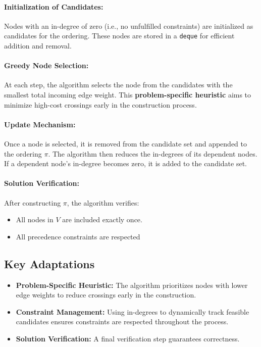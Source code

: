 \documentclass{article}
\begin{document}
\paragraph{Initialization of Candidates:}
Nodes with an in-degree of zero (i.e., no unfulfilled constraints) are initialized as candidates for the ordering. These nodes are stored in a \texttt{deque} for efficient addition and removal.

\paragraph{Greedy Node Selection:}
At each step, the algorithm selects the node from the candidates with the smallest total incoming edge weight. This \textbf{problem-specific heuristic} aims to minimize high-cost crossings early in the construction process.

\paragraph{Update Mechanism:}
Once a node is selected, it is removed from the candidate set and appended to the ordering \( \pi \). The algorithm then reduces the in-degrees of its dependent nodes. If a dependent node's in-degree becomes zero, it is added to the candidate set.

\paragraph{Solution Verification:}
After constructing \( \pi \), the algorithm verifies:
\begin{itemize}
    \item All nodes in \( V \) are included exactly once.
    \item All precedence constraints are respected
\end{itemize}

\subsection*{Key Adaptations}
\begin{itemize}
    \item \textbf{Problem-Specific Heuristic:} The algorithm prioritizes nodes with lower edge weights to reduce crossings early in the construction.
    \item \textbf{Constraint Management:} Using in-degrees to dynamically track feasible candidates ensures constraints are respected throughout the process.
    \item \textbf{Solution Verification:} A final verification step guarantees correctness.
\end{itemize}
\end{document}
